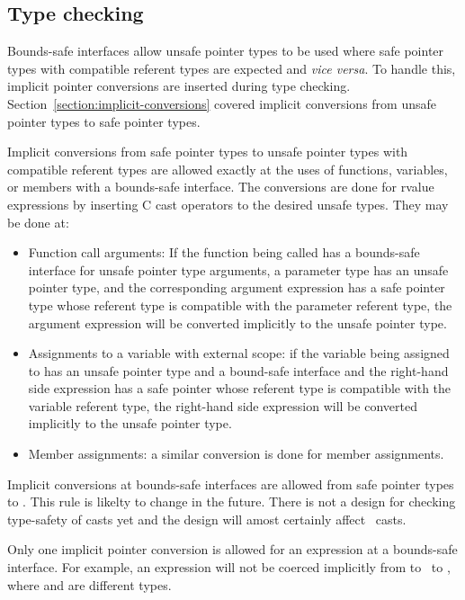 \subsection{Type checking}

Bounds-safe interfaces allow unsafe pointer types to be used
where safe pointer types with compatible referent types are expected
and {\it vice versa}.
To handle this, implicit pointer conversions are inserted during type checking.
Section~\ref{section:implicit-conversions} covered implicit conversions from unsafe pointer types to safe pointer types.

Implicit conversions from safe pointer types to unsafe pointer types
with compatible referent types are allowed exactly at the uses of functions,
variables, or members with a  bounds-safe interface.  The conversions are done for rvalue expressions by inserting C cast operators to the desired unsafe types.
They may be done at:
\begin{itemize}
\item Function call arguments: If the function being called has a 
      bounds-safe interface for unsafe pointer type arguments, a parameter type 
      has an unsafe pointer type, and the corresponding argument expression has a safe
      pointer type whose referent type is compatible with the parameter
      referent type, the argument expression will be converted implicitly to the 
      unsafe pointer type.
\item Assignments to a variable with external scope: if the variable being
     assigned to has an unsafe pointer type and a bound-safe interface and the
     right-hand side expression has a safe pointer whose referent type is
     compatible with the
     variable referent type, the right-hand side expression will be converted
     implicitly to the unsafe pointer type.
\item
   Member assignments: a similar conversion is done for member assignments.
\end{itemize}

Implicit conversions at bounds-safe interfaces are allowed from safe pointer types to 
\unsafeptrvoid.  This rule is likelty to change in the future.  There is not a  design for
checking type-safety of casts yet and the design will amost certainly affect 
\unsafeptrvoid\ casts.

Only one implicit pointer conversion is allowed for an expression at a bounds-safe
interface.  For example, an expression will not be
coerced implicitly from  to \unsafeptrvoid\ to
, where  and  are different types.


